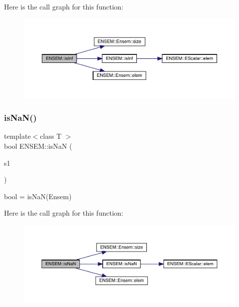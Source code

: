 Here is the call graph for this function\+:\nopagebreak
\begin{figure}[H]
\begin{center}
\leavevmode
\includegraphics[width=350pt]{d1/d9e/group__eensem_gadb04ba05461a486afdf403c61b5bff34_cgraph}
\end{center}
\end{figure}
\mbox{\label{group__eensem_ga2567a8b58f681cf59bfe43ccf72d2d54}} 
\subsubsection{\texorpdfstring{isNaN()}{isNaN()}}
{\footnotesize\ttfamily template$<$class T $>$ \\
bool E\+N\+S\+E\+M\+::is\+NaN (\begin{DoxyParamCaption}\item[{const \mbox{\hyperlink{classENSEM_1_1Ensem}{Ensem}}$<$ T $>$ \&}]{s1 }\end{DoxyParamCaption})}



bool = is\+Na\+N(\+Ensem) 

Here is the call graph for this function\+:\nopagebreak
\begin{figure}[H]
\begin{center}
\leavevmode
\includegraphics[width=350pt]{d1/d9e/group__eensem_ga2567a8b58f681cf59bfe43ccf72d2d54_cgraph}
\end{center}
\end{figure}
\mbox{\label{group__eensem_gaa66b7f8af2e0f2f38b3a8387b5848c5b}} 
